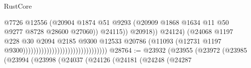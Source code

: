 \begin{lexlean}{RustCore}
\begin{coremodule}
                                                                        @7726
                                                                        @12556
                                                                        (@20904
                                                                          @1874
                                                                          @51
                                                                          @9293
                                                                          (@20909
                                                                            @1868
                                                                            @1634
                                                                            @11
                                                                            @50
                                                                            @9277
                                                                            @8728
                                                                            @28600
                                                                            @27060))
                                                                        @24115))
                                                                    @20918))
                                                                @24124)
                                                              (@24068
                                                                @1197
                                                                @228
                                                                @30
                                                                @2094
                                                                @2185
                                                                @9300
                                                                @12533
                                                                @20786
                                                                (@11093
                                                                  (@12731
                                                                    @1197
                                                                    @9300))))))))))))))))))))))))))))))))
@28764 := @23932
    (@23955
      (@23972
        (@23985
          (@23994
            (@23998
              (@24037
                (@24126
                  (@24181
                    (@24248
                      (@24287

\end{coremodule}
\end{lexlean}
